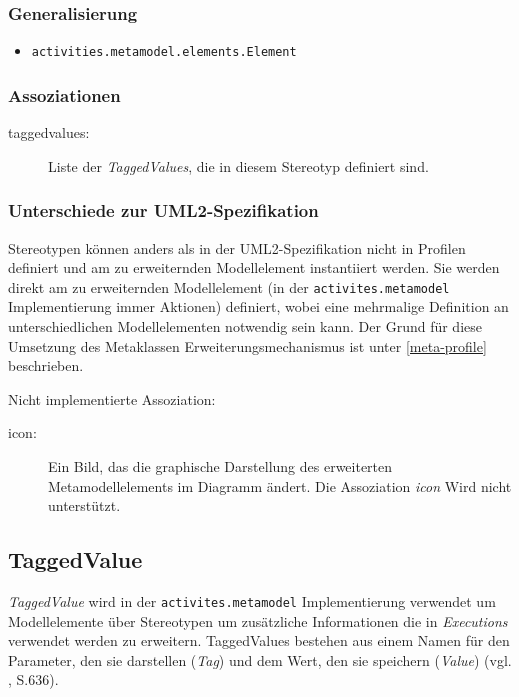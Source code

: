 \subsubsection{Generalisierung}
\begin{itemize}
\item \texttt{activities.metamodel.elements.Element}
\end{itemize}

\subsubsection{Assoziationen}
\begin{description}
\item[taggedvalues:] Liste der \emph{TaggedValues}, die in diesem Stereotyp definiert sind.
\end{description}

\subsubsection{Unterschiede zur UML2-Spezifikation}
Stereotypen können anders als in der UML2-Spezifikation nicht in Profilen definiert und am zu erweiternden Modellelement instantiiert werden. Sie werden direkt am zu erweiternden Modellelement (in der \texttt{activites.metamodel} Implementierung immer Aktionen) definiert, wobei eine mehrmalige Definition an unterschiedlichen Modellelementen notwendig sein kann. Der Grund für diese Umsetzung des Metaklassen Erweiterungsmechanismus ist unter \ref{meta-profile} beschrieben.

Nicht implementierte Assoziation:
\begin{description}
\item[icon:] Ein Bild, das die graphische Darstellung des erweiterten Metamodellelements im Diagramm ändert. Die Assoziation \emph{icon} Wird nicht unterstützt.
\end{description}


\subsection{TaggedValue}
\emph{TaggedValue} wird in der \texttt{activites.metamodel} Implementierung verwendet um Modellelemente über Stereotypen um zusätzliche Informationen die in \emph{Executions} verwendet werden zu erweitern. TaggedValues bestehen aus einem Namen für den Parameter, den sie darstellen (\emph{Tag}) und dem Wert, den sie speichern (\emph{Value}) (vgl. \citep{RumbaughJacobsonBooch2005}, S.636).

